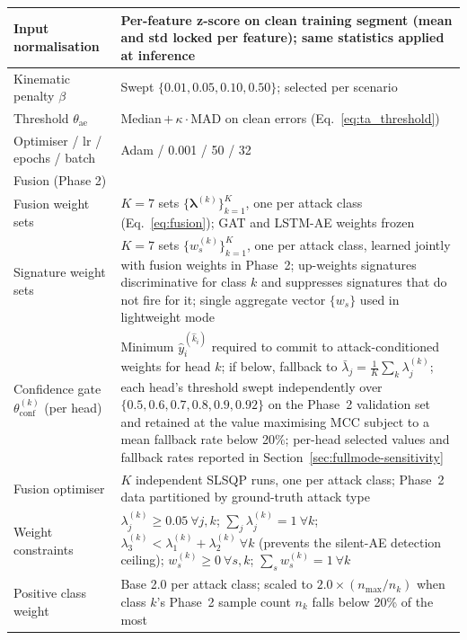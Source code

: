 \documentclass[12pt, a4paper]{report}
\begin{document}
\begin{longtable}{|p{6.0cm}|p{8.0cm}|}
\hline
Input normalisation
  & Per-feature z-score on clean training segment
    (mean and std locked per feature);
    same statistics applied at inference \\
\hline
Kinematic penalty $\beta$
  & Swept $\{0.01,0.05,0.10,0.50\}$; selected per scenario \\
\hline
Threshold $\theta_{\mathrm{ae}}$
  & Median\,$+\,\kappa\cdot$MAD on clean errors
    (Eq.~\ref{eq:ta_threshold}) \\
\hline
Optimiser / lr / epochs / batch
  & Adam / 0.001 / 50 / 32 \\
\hline
\multicolumn{2}{l}{Fusion (Phase 2)} \\
\hline
Fusion weight sets
  & $K{=}7$ sets $\{\boldsymbol{\lambda}^{(k)}\}_{k=1}^{K}$,
    one per attack class (Eq.~\ref{eq:fusion});
    GAT and LSTM-AE weights frozen \\
\hline
Signature weight sets
  & $K{=}7$ sets $\{w_s^{(k)}\}_{k=1}^{K}$, one per attack
    class, learned jointly with fusion weights in Phase~2;
    up-weights signatures discriminative for class $k$ and
    suppresses signatures that do not fire for it;
    single aggregate vector $\{w_s\}$ used in lightweight mode \\
\hline
Confidence gate $\theta_{\mathrm{conf}}^{(k)}$ (per head)
  & Minimum $\hat{y}_i^{(\hat{k}_i)}$ required to commit to
    attack-conditioned weights for head $k$; if below, fallback to
    $\bar{\lambda}_j = \tfrac{1}{K}\sum_k\lambda_j^{(k)}$;
    each head's threshold swept independently over
    $\{0.5, 0.6, 0.7, 0.8, 0.9, 0.92\}$ on the Phase~2 validation set
    and retained at the value maximising MCC subject to a
    mean fallback rate below 20\%; per-head selected values and
    fallback rates reported in
    Section~\ref{sec:fullmode-sensitivity} \\
\hline
Fusion optimiser
  & $K$ independent SLSQP runs, one per attack class;
    Phase~2 data partitioned by ground-truth attack type \\
\hline
Weight constraints
  & $\lambda_j^{(k)} \geq 0.05\ \forall j,k$;\quad
    $\sum_j \lambda_j^{(k)} = 1\ \forall k$;\quad
    $\lambda_3^{(k)} < \lambda_1^{(k)} + \lambda_2^{(k)}\ \forall k$
    (prevents the silent-AE detection ceiling);\quad
    $w_s^{(k)} \geq 0\ \forall s,k$;\quad
    $\sum_s w_s^{(k)} = 1\ \forall k$ \\
\hline
Positive class weight
  & Base 2.0 per attack class; scaled to
    $2.0 \times (n_{\max}/n_k)$ when class $k$'s Phase~2
    sample count $n_k$ falls below 20\% of the most

\end{longtable}
\end{document}
